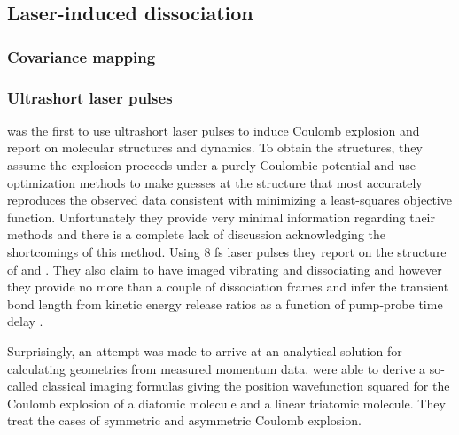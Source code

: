 \subsection{Laser-induced dissociation}
\subsubsection{Covariance mapping}
\subsubsection{Ultrashort laser pulses}
\citet{Legare05structure,Legare05dynamics} was the first to use ultrashort laser pulses to induce Coulomb explosion and report on molecular structures and dynamics. To obtain the structures, they assume the explosion proceeds under a purely Coulombic potential and use optimization methods to make guesses at the structure that most accurately reproduces the observed data consistent with minimizing a least-squares objective function. Unfortunately they provide very minimal information regarding their methods and there is a complete lack of discussion acknowledging the shortcomings of this method\footnotemark. Using 8 fs laser pulses they report on the structure of  and  \citep{Legare05structure}. They also claim to have imaged vibrating  and dissociating  and  however they provide no more than a couple of dissociation frames and infer the transient  bond length from kinetic energy release ratios as a function of pump-probe time delay \citep{Legare05dynamics}.


Surprisingly, an attempt was made to arrive at an analytical solution for calculating geometries from measured momentum data. \citet{Nagaya04} were able to derive a so-called classical imaging formulas giving the position wavefunction squared for the Coulomb explosion of a diatomic molecule and a linear triatomic molecule\footnotemark. They treat the cases of symmetric and asymmetric Coulomb explosion.


